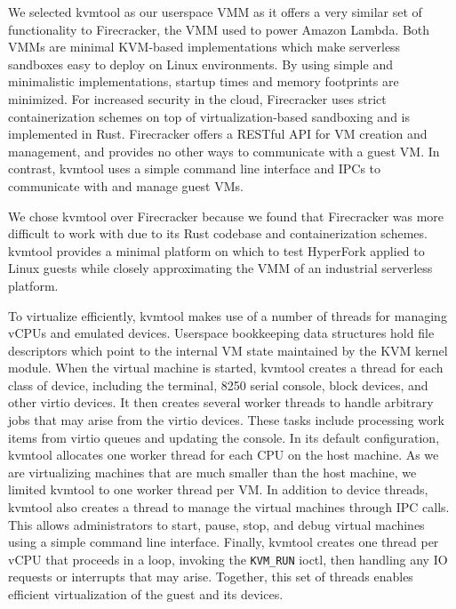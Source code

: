 We selected kvmtool as our userspace VMM as it offers a very similar set of
functionality to Firecracker, the VMM used to power Amazon Lambda. Both VMMs are
minimal KVM-based implementations which make serverless sandboxes easy to deploy
on Linux environments. By using simple and minimalistic implementations, startup
times and memory footprints are minimized. For increased security in the cloud,
Firecracker uses strict containerization schemes on top of virtualization-based
sandboxing and is implemented in Rust. Firecracker offers a RESTful API for VM
creation and management, and provides no other ways to communicate with a guest
VM. In contrast, kvmtool uses a simple command line interface and IPCs to
communicate with and manage guest VMs.

We chose kvmtool over Firecracker because we found that Firecracker was more
difficult to work with due to its Rust codebase and containerization schemes.
kvmtool provides a minimal platform on which to test HyperFork applied to Linux
guests while closely approximating the VMM of an industrial serverless platform.

To virtualize efficiently, kvmtool makes use of a number of threads for
managing vCPUs and emulated devices. Userspace bookkeeping data structures hold
file descriptors which point to the internal VM state maintained by the KVM
kernel module. When the virtual machine is started, kvmtool creates a thread
for each class of device, including the terminal, 8250 serial console, block
devices, and other virtio devices. It then creates several worker threads to
handle arbitrary jobs that may arise from the virtio devices. These tasks
include processing work items from virtio queues and updating the console. In
its default configuration, kvmtool allocates one worker thread for each CPU on
the host machine. As we are virtualizing machines that are much smaller than
the host machine, we limited kvmtool to one worker thread per VM. In addition
to device threads, kvmtool also creates a thread to manage the virtual machines
through IPC calls. This allows administrators to start, pause, stop, and debug
virtual machines using a simple command line interface. Finally, kvmtool
creates one thread per vCPU that proceeds in a loop, invoking the
\texttt{KVM\_RUN} ioctl, then handling any IO requests or interrupts that may
arise. Together, this set of threads enables efficient virtualization of the
guest and its devices.
